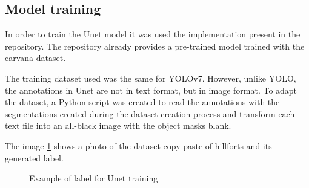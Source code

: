 \subsection{Model training}
In order to train the Unet model it was used the implementation present in the repository\cite{unetRep}. The repository already provides a pre-trained model trained with the carvana dataset.

The training dataset used was the same for YOLOv7. However, unlike YOLO, the annotations in Unet are not in text format, but in image format. To adapt the dataset, a Python script was created to read the annotations with the segmentations created during the dataset creation process and transform each text file into an all-black image with the object masks blank.

The image \ref{Example of label for Unet training} shows a photo of the dataset copy paste of hillforts and its generated label.

\begin{figure}[H]
    \centering
    \qquad
    \caption{Example of label for Unet training}%
    \label{Example of label for Unet training}
\end{figure}

